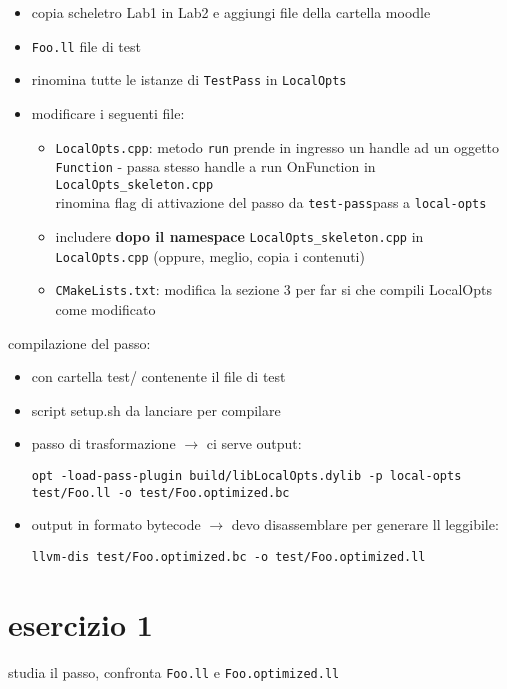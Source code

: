 \begin{emphasize-blue}
  \begin{itemize}
    \item copia scheletro Lab1 in Lab2 e aggiungi file della cartella moodle
    \item \lstinline|Foo.ll| file di test
    \item rinomina tutte le istanze di \lstinline|TestPass| in \lstinline|LocalOpts|
    \item modificare i seguenti file:
      \begin{itemize}
        \item \lstinline|LocalOpts.cpp|: metodo \lstinline|run| prende in ingresso un handle ad un oggetto \lstinline|Function| - passa stesso handle a run OnFunction in \lstinline|LocalOpts_skeleton.cpp|\\
              rinomina flag di attivazione del passo da \lstinline|test-pass|pass a \lstinline|local-opts|
        \item includere \textbf{dopo il namespace} \lstinline|LocalOpts_skeleton.cpp| in \lstinline|LocalOpts.cpp| (oppure, meglio, copia i contenuti)
        \item \lstinline|CMakeLists.txt|: modifica la sezione 3 per far si che compili LocalOpts come modificato
      \end{itemize}
\end{itemize}
compilazione del passo:
\begin{itemize}
  \item con cartella test/ contenente il file di test
  \item script setup.sh da lanciare per compilare
  \item passo di trasformazione $\rightarrow$ ci serve output:\\
    \begin{lstlisting}
opt -load-pass-plugin build/libLocalOpts.dylib -p local-opts test/Foo.ll -o test/Foo.optimized.bc\end{lstlisting}
  \item output in formato bytecode $\rightarrow$ devo disassemblare per generare ll leggibile:\\
  \begin{lstlisting}
llvm-dis test/Foo.optimized.bc -o test/Foo.optimized.ll\end{lstlisting}
  
\end{itemize}

\end{emphasize-blue}

\section{esercizio 1}

studia il passo, confronta \lstinline|Foo.ll| e \lstinline|Foo.optimized.ll|



